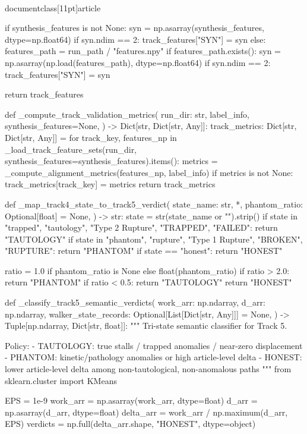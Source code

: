 \\documentclass[11pt]{article}
\begin{document}
\begin{CodeBlock}
    if synthesis_features is not None:
        syn = np.asarray(synthesis_features, dtype=np.float64)
        if syn.ndim == 2:
            track_features["SYN"] = syn
    else:
        features_path = run_path / "features.npy"
        if features_path.exists():
            syn = np.asarray(np.load(features_path), dtype=np.float64)
            if syn.ndim == 2:
                track_features["SYN"] = syn

    return track_features


def _compute_track_validation_metrics(
    run_dir: str,
    label_info,
    synthesis_features=None,
) -> Dict[str, Dict[str, Any]]:
    track_metrics: Dict[str, Dict[str, Any]] = {}
    for track_key, features_np in _load_track_feature_sets(run_dir, synthesis_features=synthesis_features).items():
        metrics = _compute_alignment_metrics(features_np, label_info)
        if metrics is not None:
            track_metrics[track_key] = metrics
    return track_metrics


def _map_track4_state_to_track5_verdict(
    state_name: str,
    *,
    phantom_ratio: Optional[float] = None,
) -> str:
    state = str(state_name or "").strip()
    if state in {"trapped", "tautology", "Type 2 Rupture", "TRAPPED", "FAILED"}:
        return "TAUTOLOGY"
    if state in {"phantom", "rupture", "Type 1 Rupture", "BROKEN", "RUPTURE"}:
        return "PHANTOM"
    if state == "honest":
        return "HONEST"

    ratio = 1.0 if phantom_ratio is None else float(phantom_ratio)
    if ratio > 2.0:
        return "PHANTOM"
    if ratio < 0.5:
        return "TAUTOLOGY"
    return "HONEST"


def _classify_track5_semantic_verdicts(
    work_arr: np.ndarray,
    d_arr: np.ndarray,
    walker_state_records: Optional[List[Dict[str, Any]]] = None,
) -> Tuple[np.ndarray, Dict[str, float]]:
    """
    Tri-state semantic classifier for Track 5.

    Policy:
    - TAUTOLOGY: true stalls / trapped anomalies / near-zero displacement
    - PHANTOM: kinetic/pathology anomalies or high article-level delta
    - HONEST: lower article-level delta among non-tautological, non-anomalous paths
    """
    from sklearn.cluster import KMeans

    EPS = 1e-9
    work_arr = np.asarray(work_arr, dtype=float)
    d_arr = np.asarray(d_arr, dtype=float)
    delta_arr = work_arr / np.maximum(d_arr, EPS)
    verdicts = np.full(delta_arr.shape, "HONEST", dtype=object)


\end{CodeBlock}
\end{document}
